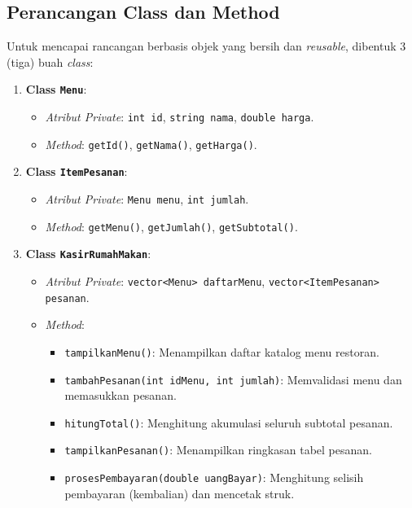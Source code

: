 \documentclass[12pt,a4paper]{article}
\begin{document}
\subsection{Perancangan Class dan Method}
Untuk mencapai rancangan berbasis objek yang bersih dan \textit{reusable}, dibentuk 3 (tiga) buah \textit{class}:
\begin{enumerate}
    \item \textbf{Class \texttt{Menu}}:
    \begin{itemize}
        \item \textit{Atribut Private}: \texttt{int id}, \texttt{string nama}, \texttt{double harga}.
        \item \textit{Method}: \texttt{getId()}, \texttt{getNama()}, \texttt{getHarga()}.
    \end{itemize}
    \item \textbf{Class \texttt{ItemPesanan}}:
    \begin{itemize}
        \item \textit{Atribut Private}: \texttt{Menu menu}, \texttt{int jumlah}.
        \item \textit{Method}: \texttt{getMenu()}, \texttt{getJumlah()}, \texttt{getSubtotal()}.
    \end{itemize}
    \item \textbf{Class \texttt{KasirRumahMakan}}:
    \begin{itemize}
        \item \textit{Atribut Private}: \texttt{vector<Menu> daftarMenu}, \texttt{vector<ItemPesanan> pesanan}.
        \item \textit{Method}:
        \begin{itemize}
            \item \texttt{tampilkanMenu()}: Menampilkan daftar katalog menu restoran.
            \item \texttt{tambahPesanan(int idMenu, int jumlah)}: Memvalidasi menu dan memasukkan pesanan.
            \item \texttt{hitungTotal()}: Menghitung akumulasi seluruh subtotal pesanan.
            \item \texttt{tampilkanPesanan()}: Menampilkan ringkasan tabel pesanan.
            \item \texttt{prosesPembayaran(double uangBayar)}: Menghitung selisih pembayaran (kembalian) dan mencetak struk.
        \end{itemize}
    \end{itemize}
\end{enumerate}
\end{document}
